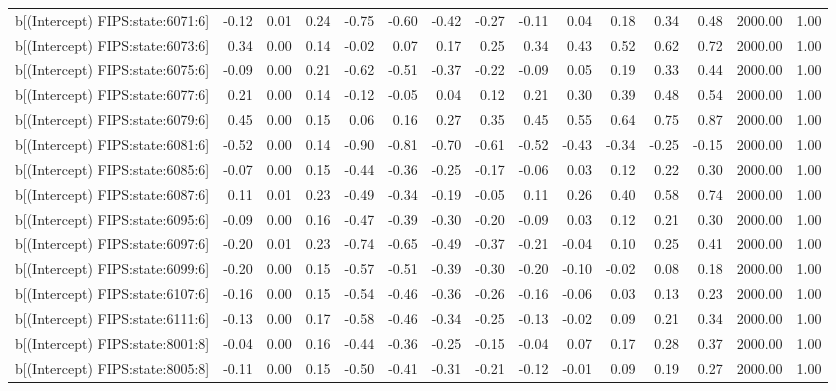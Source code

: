 \begin{table}[ht]
\begin{tabular}{rrrrrrrrrrrrrrr}
  b[(Intercept) FIPS:state:6071:6] & -0.12 & 0.01 & 0.24 & -0.75 & -0.60 & -0.42 & -0.27 & -0.11 & 0.04 & 0.18 & 0.34 & 0.48 & 2000.00 & 1.00 \\ 
  b[(Intercept) FIPS:state:6073:6] & 0.34 & 0.00 & 0.14 & -0.02 & 0.07 & 0.17 & 0.25 & 0.34 & 0.43 & 0.52 & 0.62 & 0.72 & 2000.00 & 1.00 \\ 
  b[(Intercept) FIPS:state:6075:6] & -0.09 & 0.00 & 0.21 & -0.62 & -0.51 & -0.37 & -0.22 & -0.09 & 0.05 & 0.19 & 0.33 & 0.44 & 2000.00 & 1.00 \\ 
  b[(Intercept) FIPS:state:6077:6] & 0.21 & 0.00 & 0.14 & -0.12 & -0.05 & 0.04 & 0.12 & 0.21 & 0.30 & 0.39 & 0.48 & 0.54 & 2000.00 & 1.00 \\ 
  b[(Intercept) FIPS:state:6079:6] & 0.45 & 0.00 & 0.15 & 0.06 & 0.16 & 0.27 & 0.35 & 0.45 & 0.55 & 0.64 & 0.75 & 0.87 & 2000.00 & 1.00 \\ 
  b[(Intercept) FIPS:state:6081:6] & -0.52 & 0.00 & 0.14 & -0.90 & -0.81 & -0.70 & -0.61 & -0.52 & -0.43 & -0.34 & -0.25 & -0.15 & 2000.00 & 1.00 \\ 
  b[(Intercept) FIPS:state:6085:6] & -0.07 & 0.00 & 0.15 & -0.44 & -0.36 & -0.25 & -0.17 & -0.06 & 0.03 & 0.12 & 0.22 & 0.30 & 2000.00 & 1.00 \\ 
  b[(Intercept) FIPS:state:6087:6] & 0.11 & 0.01 & 0.23 & -0.49 & -0.34 & -0.19 & -0.05 & 0.11 & 0.26 & 0.40 & 0.58 & 0.74 & 2000.00 & 1.00 \\ 
  b[(Intercept) FIPS:state:6095:6] & -0.09 & 0.00 & 0.16 & -0.47 & -0.39 & -0.30 & -0.20 & -0.09 & 0.03 & 0.12 & 0.21 & 0.30 & 2000.00 & 1.00 \\ 
  b[(Intercept) FIPS:state:6097:6] & -0.20 & 0.01 & 0.23 & -0.74 & -0.65 & -0.49 & -0.37 & -0.21 & -0.04 & 0.10 & 0.25 & 0.41 & 2000.00 & 1.00 \\ 
  b[(Intercept) FIPS:state:6099:6] & -0.20 & 0.00 & 0.15 & -0.57 & -0.51 & -0.39 & -0.30 & -0.20 & -0.10 & -0.02 & 0.08 & 0.18 & 2000.00 & 1.00 \\ 
  b[(Intercept) FIPS:state:6107:6] & -0.16 & 0.00 & 0.15 & -0.54 & -0.46 & -0.36 & -0.26 & -0.16 & -0.06 & 0.03 & 0.13 & 0.23 & 2000.00 & 1.00 \\ 
  b[(Intercept) FIPS:state:6111:6] & -0.13 & 0.00 & 0.17 & -0.58 & -0.46 & -0.34 & -0.25 & -0.13 & -0.02 & 0.09 & 0.21 & 0.34 & 2000.00 & 1.00 \\ 
  b[(Intercept) FIPS:state:8001:8] & -0.04 & 0.00 & 0.16 & -0.44 & -0.36 & -0.25 & -0.15 & -0.04 & 0.07 & 0.17 & 0.28 & 0.37 & 2000.00 & 1.00 \\ 
  b[(Intercept) FIPS:state:8005:8] & -0.11 & 0.00 & 0.15 & -0.50 & -0.41 & -0.31 & -0.21 & -0.12 & -0.01 & 0.09 & 0.19 & 0.27 & 2000.00 & 1.00 \\ 

\end{tabular}
\end{table}
